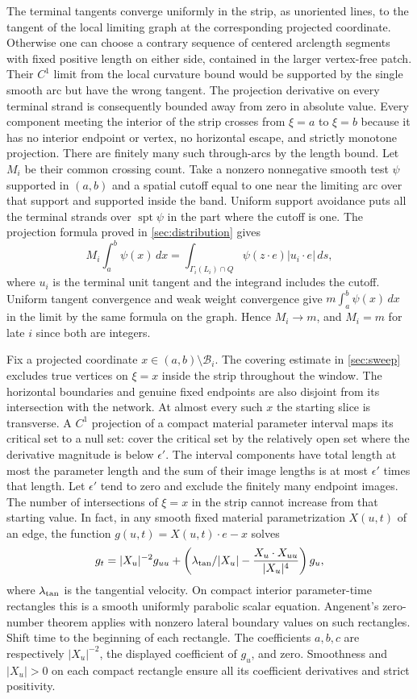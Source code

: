 The terminal tangents converge uniformly in the strip, as unoriented lines, to the tangent of the local limiting graph at the corresponding projected coordinate. Otherwise one can choose a contrary sequence of centered arclength segments with fixed positive length on either side, contained in the larger vertex-free patch. Their \(C^1\) limit from the local curvature bound would be supported by the single smooth arc but have the wrong tangent. The projection derivative on every terminal strand is consequently bounded away from zero in absolute value. Every component meeting the interior of the strip crosses from \(\xi=a\) to \(\xi=b\) because it has no interior endpoint or vertex, no horizontal escape, and strictly monotone projection. There are finitely many such through-arcs by the length bound. Let \(M_i\) be their common crossing count. Take a nonzero nonnegative smooth test \(\psi\) supported in \((a,b)\) and a spatial cutoff equal to one near the limiting arc over that support and supported inside the band. Uniform support avoidance puts all the terminal strands over \(\operatorname{spt}\psi\) in the part where the cutoff is one. The projection formula proved in \cref{sec:distribution} gives
\[
M_i\int_a^b\psi(x)\,dx
 =\int_{\Gamma_i(L_i)\cap Q}\psi(z\cdot e)|u_i\cdot e|\,ds,
\]
where \(u_i\) is the terminal unit tangent and the integrand includes the cutoff. Uniform tangent convergence and weak weight convergence give \(m\int_a^b\psi(x)\,dx\) in the limit by the same formula on the graph. Hence \(M_i\to m\), and \(M_i=m\) for late \(i\) since both are integers.

Fix a projected coordinate \(x\in(a,b)\setminus\mathcal B_i\). The covering estimate in \cref{sec:sweep} excludes true vertices on \(\xi=x\) inside the strip throughout the window. The horizontal boundaries and genuine fixed endpoints are also disjoint from its intersection with the network. At almost every such \(x\) the starting slice is transverse. A \(C^1\) projection of a compact material parameter interval maps its critical set to a null set: cover the critical set by the relatively open set where the derivative magnitude is below \(\epsilon'\). The interval components have total length at most the parameter length and the sum of their image lengths is at most \(\epsilon'\) times that length. Let \(\epsilon'\) tend to zero and exclude the finitely many endpoint images. The number of intersections of \(\xi=x\) in the strip cannot increase from that starting value. In fact, in any smooth fixed material parametrization \(X(u,t)\) of an edge, the function \(g(u,t)=X(u,t)\cdot e-x\) solves \[
g_t=|X_u|^{-2}g_{uu}
   +\left(\lambda_{\rm tan}/|X_u|-\frac{X_u\cdot X_{uu}}{|X_u|^4}\right)g_u,
\] where \(\lambda_{\rm tan}\) is the tangential velocity. On compact interior parameter-time rectangles this is a smooth uniformly parabolic scalar equation. Angenent's zero-number theorem \cite[Theorem~A]{AngNodal} applies with nonzero lateral boundary values on such rectangles. Shift time to the beginning of each rectangle. The coefficients \(a,b,c\) are respectively \(|X_u|^{-2}\), the displayed coefficient of \(g_u\), and zero. Smoothness and \(|X_u|>0\) on each compact rectangle ensure all its coefficient derivatives and strict positivity.

